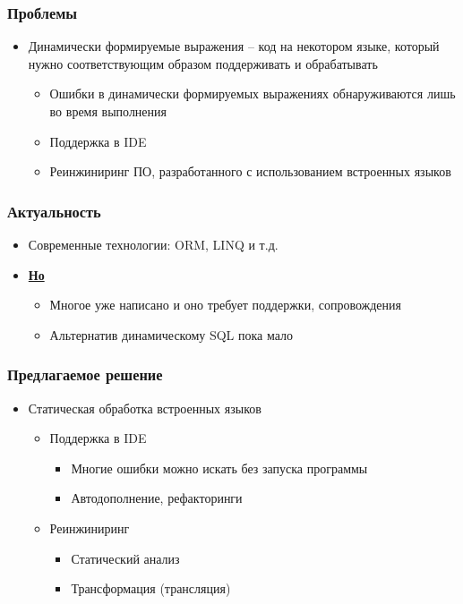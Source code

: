 \documentclass{beamer}
\begin{document}
\begin{frame}[fragile]
	\transwipe[direction=90]
	\frametitle{Проблемы}
	\begin{itemize}
	    \item Динамически формируемые выражения -- код на некотором языке, который нужно соответствующим образом поддерживать и обрабатывать
        \begin{itemize}
    	    \item Ошибки в динамически формируемых выражениях обнаруживаются лишь во время выполнения
	        \item Поддержка в IDE
	        \item Реинжиниринг ПО, разработанного с использованием встроенных языков
	    \end{itemize}
    \end{itemize}
\end{frame}

\begin{frame}[fragile]
	\transwipe[direction=90]
	\frametitle{Актуальность}
	\begin{itemize}
	    \item Современные технологии: ORM, LINQ и т.д. 
	    \item \textbf{\underline{Но}}
        \begin{itemize}
    	    \item Многое уже написано и оно требует поддержки, сопровождения
	        \item Альтернатив динамическому SQL пока мало
	    \end{itemize}
    \end{itemize}
\end{frame}

\begin{frame}[fragile]
	\transwipe[direction=90]
	\frametitle{Предлагаемое решение}
	\begin{itemize}
	    \item Статическая обработка встроенных языков
	    \begin{itemize}
		    \item Поддержка в IDE
        	\begin{itemize}
        		\item Многие ошибки можно искать без запуска программы
            	\item Автодополнение, рефакторинги
            \end{itemize}
	        \item Реинжиниринг
        	\begin{itemize}
        		\item Статический анализ
            	\item Трансформация (трансляция)
            \end{itemize}
	    \end{itemize}
    \end{itemize}
\end{frame}
\end{document}
